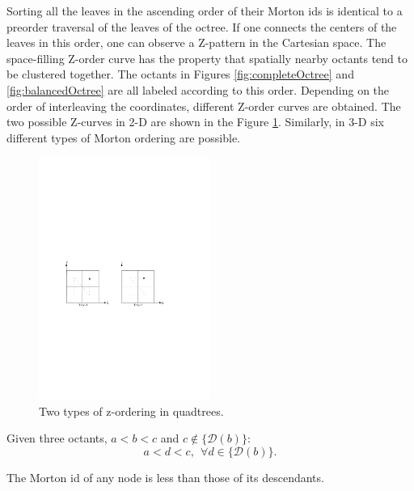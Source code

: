 \begin{prop}
Sorting all the leaves in the ascending order of their Morton ids is
identical to a preorder traversal of the leaves of the octree. If one
connects the centers of the leaves in this order, one can observe a
Z-pattern in the Cartesian space. The space-filling Z-order curve has
the property that spatially nearby octants tend to be clustered
together. The octants in Figures \ref{fig:completeOctree} and
\ref{fig:balancedOctree} are all labeled according to this
order. Depending on the order of interleaving the coordinates,
different Z-order curves are obtained. The two possible Z-curves in
2-D are shown in the Figure \ref{fig:ztypes}. Similarly, in 3-D six
different types of Morton ordering are possible.
  \label{ZdefProp}
\end{prop}

\begin{figure}
  \begin{center}
    \includegraphics[width=0.5\textwidth]{images/MortonZtypes}  
  \end{center}
  \caption{Two types of z-ordering in quadtrees.}
    \label{fig:ztypes}
\end{figure}

\begin{prop}
Given three octants, $a < b < c$ and $c \notin \{\mathcal{D}(b)\}$:
  \[
  a < d < c, ~~\forall d \in \{\mathcal{D}(b)\}.
  \]
  \label{prop:decFirst}
\end{prop}

\begin{prop}
The Morton id of any node is less than those of its descendants.
  \label{prop:ancLesser}
\end{prop}

